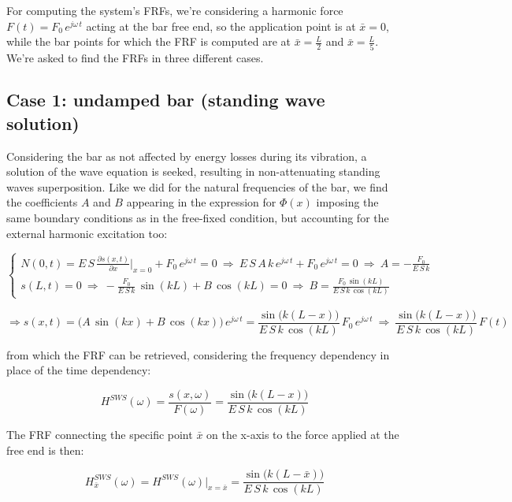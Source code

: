 \documentclass[a4paper,12pt,oneside]{article}
\begin{document}
For computing the system's FRFs, we're considering a harmonic force $ F(t) = F_0 \, e^{j \omega \, t} $ acting at the bar free end, so the application point is at $ \bar{x} = 0 $, while the bar points for which the FRF is computed are at $ \bar{x} = \frac{L}{2} $ and $ \bar{x} = \frac{L}{5} $. We're asked to find the FRFs in three different cases.

\subsection*{Case 1: undamped bar (standing wave solution)}

Considering the bar as not affected by energy losses during its vibration, a solution of the wave equation is seeked, resulting in non-attenuating standing waves superposition. Like we did for the natural frequencies of the bar, we find the coefficients $ A $ and $ B $ appearing in the expression for $ \Phi(x) $ imposing the same boundary conditions as in the free-fixed condition, but accounting for the external harmonic excitation too:

\[ \begin{cases}
	N(0,t) = E \, S \, \frac{\partial s(x,t)}{\partial x} \Big|_{x=0} + %
		F_0 \, e^{j \omega \, t} = 0 %
		~ \Rightarrow ~ E \, S \, A \, k \, e^{j \omega \, t} + %
		F_0 \, e^{j \omega \, t} = 0 %
		~ \Rightarrow ~ A = -\frac{F_0}{E \, S \, k} \\
	s(L,t) = 0 ~ \Rightarrow ~ -\frac{F_0}{E \, S \, k} \, \sin(kL) + B \, \cos(kL) = 0 %
		~ \Rightarrow ~ B = \frac{F_0 \, \sin(kL)}{E \, S \, k \, \cos(kL)}
\end{cases} \]

\[
	\Rightarrow s(x,t) = \bigl(A \, \sin(kx) + B \, \cos(kx)\bigl) \, e^{j \omega \, t} =
		\frac{\sin\bigl(k(L - x)\bigr)}{E \, S \, k \, \cos(kL)} \,
		F_0 \, e^{j \omega \, t}
		~ \Rightarrow ~ \frac{\sin\bigl(k(L - x)\bigr)}{E \, S \, k \, \cos(kL)} \, F(t)
\]

from which the FRF can be retrieved, considering the frequency dependency in place of the time dependency:

\[
	H^{SWS}(\omega) = \frac{s(x, \omega)}{F(\omega)} = %
		\frac{\sin\bigl(k(L - x)\bigr)}{E \, S \, k \, \cos(kL)}
\]

\vspace{20pt}

The FRF connecting the specific point $ \bar{x} $ on the x-axis to the force applied at the free end is then:

\begin{equation}
\label{eqn:frf_sws}
	H^{SWS}_{\bar{x}}(\omega) = H^{SWS}(\omega)\big|_{x = \bar{x}} = %
		\frac{\sin\bigl(k(L - \bar{x})\bigr)}{E \, S \, k \, \cos(kL)}
\end{equation}
\end{document}
